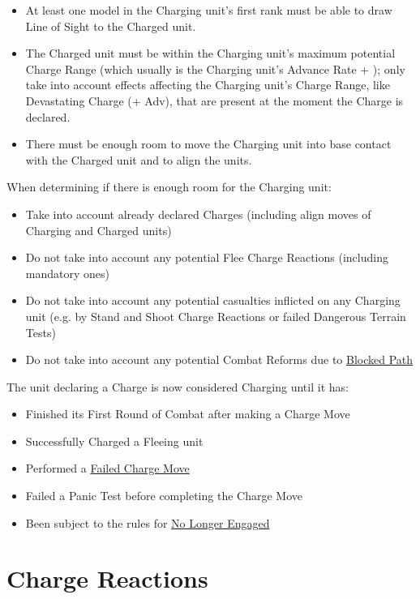 \begin{itemize}
	\item At least one model in the Charging unit's first rank must be able to draw Line of Sight to the Charged unit.
	\item The Charged unit must be within the Charging unit's maximum potential Charge Range (which usually is the Charging unit's Advance Rate + ); only take into account effects affecting the Charging unit's Charge Range, like Devastating Charge (+ Adv), that are present at the moment the Charge is declared.
	\item There must be enough room to move the Charging unit into base contact with the Charged unit and to align the units.
\end{itemize}

\columnbreak

When determining if there is enough room for the Charging unit:
\begin{itemize}
	\item Take into account already declared Charges (including align moves of Charging and Charged units)
	\item Do not take into account any potential Flee Charge Reactions (including mandatory ones)
	\item Do not take into account any potential casualties inflicted on any Charging unit (e.g. by Stand and Shoot Charge Reactions or failed Dangerous Terrain Tests)
	\item Do not take into account any potential Combat Reforms due to \hyperref[blocked_path]{Blocked Path}
\end{itemize}

The unit declaring a Charge is now considered Charging until it has:

\begin{itemize}
	\item Finished its First Round of Combat after making a Charge Move
	\item Successfully Charged a Fleeing unit
	\item Performed a \hyperref[failed_charge]{Failed Charge Move}
	\item Failed a Panic Test before completing the Charge Move
	\item Been subject to the rules for \hyperref[no_longer_engaged]{No Longer Engaged}
\end{itemize}

\section{Charge Reactions}
\label{charge_reactions}

